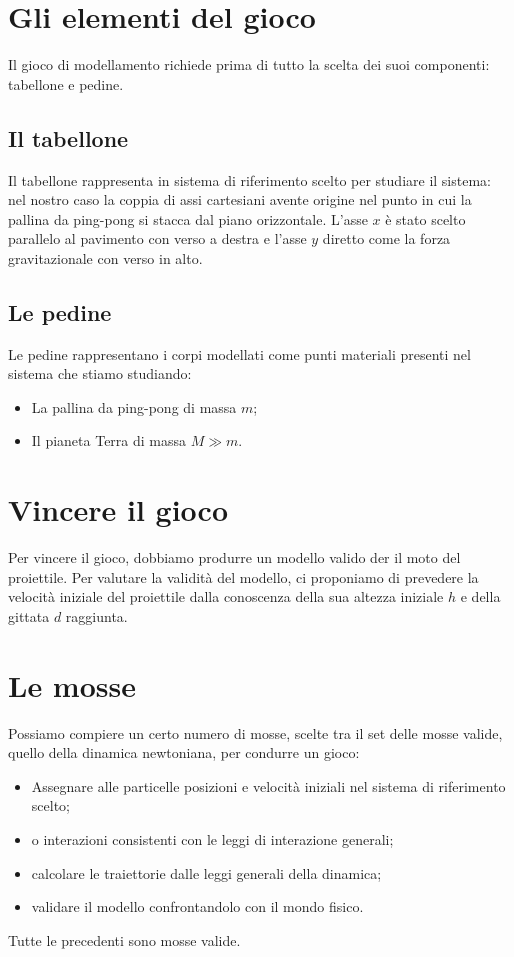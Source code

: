 \documentclass{article}
\begin{document}
\section{Gli elementi del gioco}
Il gioco di modellamento richiede prima di tutto la scelta
dei suoi componenti: tabellone e pedine.

\subsection{Il tabellone}
Il tabellone rappresenta in sistema di riferimento scelto per studiare
il sistema: nel nostro caso la coppia di assi cartesiani avente
origine nel punto in cui la pallina da ping-pong si stacca dal
piano orizzontale. L'asse $x$ è stato scelto parallelo al pavimento
con verso a destra e l'asse $y$ diretto come la forza gravitazionale
con verso in alto.

\subsection{Le pedine}
Le pedine rappresentano i corpi modellati come punti materiali
presenti nel sistema che stiamo studiando:

\begin{itemize}
\item La pallina da ping-pong di massa $m$;
\item Il pianeta Terra di massa $M \gg m$.
\end{itemize}

\section{Vincere il gioco}
Per vincere il gioco, dobbiamo produrre un modello valido
der il moto del proiettile. Per valutare la validità
del modello, ci proponiamo di prevedere la velocità iniziale
del proiettile dalla conoscenza della sua altezza iniziale
$h$ e della gittata $d$ raggiunta.

\section{Le mosse}
Possiamo compiere un certo numero di mosse, scelte tra il set
delle mosse valide, quello della dinamica newtoniana, per
condurre un gioco:

\begin{itemize}
\item Assegnare alle particelle posizioni e velocità iniziali nel sistema di riferimento scelto;
\item o interazioni consistenti con le leggi di interazione generali;
\item calcolare le traiettorie dalle leggi generali della dinamica;
\item validare il modello confrontandolo con il mondo fisico.
\end{itemize}

Tutte le precedenti sono mosse valide.

{}

\end{document}
